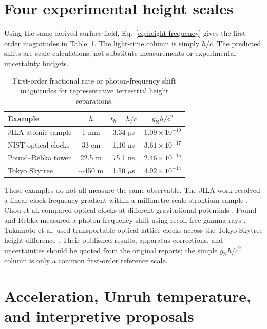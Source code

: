 \documentclass[12pt]{article}
\begin{document}
\section{Four experimental height scales}

Using the same derived surface field, Eq.~\eqref{eq:height-frequency} gives the first-order magnitudes in Table~\ref{tab:height-scales}. The light-time column is simply $h/c$. The predicted shifts are scale calculations, not substitute measurements or experimental uncertainty budgets.

\begin{table}[ht]
  \centering
  \caption{First-order fractional rate or photon-frequency shift magnitudes for representative terrestrial height separations.}
  \label{tab:height-scales}
  \small
  \begin{tabular}{lccc}
    \toprule
    Example & $h$ & $t_h=h/c$ & $g_{\mathrm{N}}h/c^2$ \\
    \midrule
    JILA atomic sample \cite{Bothwell} & 1 mm & 3.34 ps & $1.09\times10^{-19}$ \\
    NIST optical clocks \cite{Chou} & 33 cm & 1.10 ns & $3.61\times10^{-17}$ \\
    Pound--Rebka tower \cite{PoundRebka} & 22.5 m & 75.1 ns & $2.46\times10^{-15}$ \\
    Tokyo Skytree \cite{Takamoto} & $\sim$450 m & 1.50 $\mu$s & $4.92\times10^{-14}$ \\
    \bottomrule
  \end{tabular}
\end{table}

These examples do not all measure the same observable. The JILA work resolved a linear clock-frequency gradient within a millimetre-scale strontium sample \cite{Bothwell}. Chou et al. compared optical clocks at different gravitational potentials \cite{Chou}. Pound and Rebka measured a photon-frequency shift using recoil-free gamma rays \cite{PoundRebka}. Takamoto et al. used transportable optical lattice clocks across the Tokyo Skytree height difference \cite{Takamoto}. Their published results, apparatus corrections, and uncertainties should be quoted from the original reports; the simple $g_{\mathrm{N}}h/c^2$ column is only a common first-order reference scale.

\section{Acceleration, Unruh temperature, and interpretive proposals}
\end{document}
